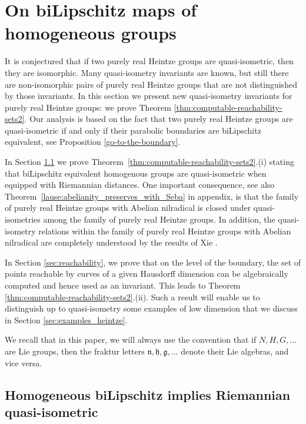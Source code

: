 \documentclass[a4paper,12pt]{amsart}
\theoremstyle{plain}
\theoremstyle{definition}
\theoremstyle{plain}
\theoremstyle{remark}
\begin{document}
\section{On biLipschitz maps of homogeneous groups}

\label{sec:lemma_of_Seba}



It is conjectured that if two purely real Heintze groups are quasi-isometric, then they are isomorphic.
Many quasi-isometry invariants are known, 
but still there are non-isomorphic pairs of  purely real Heintze groups that are not distinguished by those invariants.
In this section we present new quasi-isometry invariants for purely real Heintze groups: we prove Theorem \ref{thm:computable-reachability-sets2}. 
Our analysis is based on the fact that two purely real Heintze groups are quasi-isometric if and only if their parabolic boundaries are biLipschitz equivalent, see Proposition \ref{go-to-the-boundary}.

In Section \ref{sec:abelian-theorem-new} we prove Theorem~\ref{thm:computable-reachability-sets2}.(i) stating that biLipschitz equivalent homogenous groups are quasi-isometric when equipped with Riemannian distances.
One important consequence, see also Theorem~\ref{lause:abelianity_preserves_with_Seba} in appendix, is that the family of purely real Heintze groups with Abelian nilradical is closed under quasi-isometries among the family of purely real Heintze groups. In addition, the quasi-isometry relations within the family of purely real Heintze groups with Abelian nilradical are completely understood by the results of Xie \cite{MR3180486}.


In Section \ref{sec:reachability}, we prove that on the level of the boundary, the set of points reachable by curves of a given Hausdorff dimension can be algebraically computed and hence used as an invariant. This leads to Theorem \ref{thm:computable-reachability-sets2}.(ii). Such a result will enable us to distinguish up to quasi-isometry some examples of low dimension that we discuss in Section \ref{sec:examples_heintze}.

We recall that in this paper, we will always use the convention that if \( N,H,G, \ldots \) are Lie groups, then the fraktur letters \( \mathfrak{n}, \mathfrak{h}, \mathfrak{g}, \ldots \) denote their Lie algebras, and vice versa.


\subsection{Homogeneous biLipschitz implies Riemannian quasi-isometric}
\label{sec:abelian-theorem-new}
\end{document}
